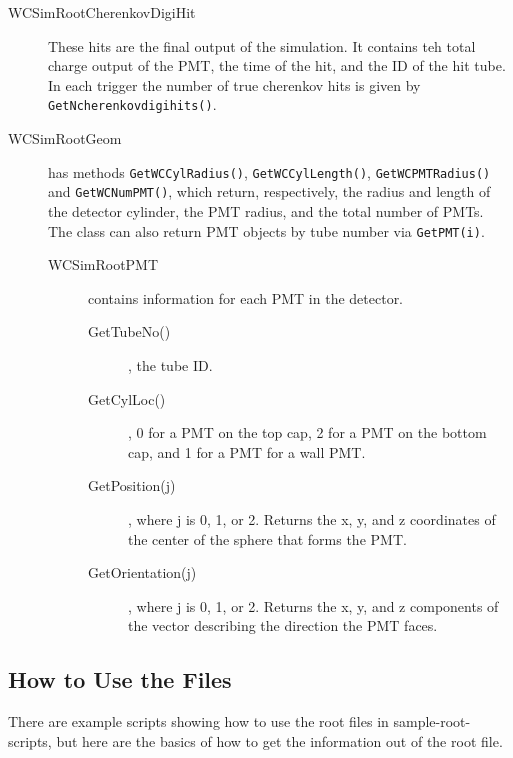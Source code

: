 \begin{description}
\begin{description}
\begin{description}
      \item[WCSimRootCherenkovDigiHit] These hits are the final output of the simulation. It contains teh total charge output of the PMT, the time of the hit, and the ID of the hit tube.  In each trigger the number of true cherenkov hits is given by \texttt{GetNcherenkovdigihits()}.
    \end{description}
  \end{description}
\end{description}


\begin{description}
  \item[WCSimRootGeom]  has methods \texttt{GetWCCylRadius()}, \texttt{GetWCCylLength()}, \texttt{GetWCPMTRadius()} and \texttt{GetWCNumPMT()}, which return, respectively, the radius and length of the detector cylinder, the PMT radius, and the total number of PMTs.  The class can also return PMT objects by tube number via \texttt{GetPMT(i)}.
    \begin{description}
    \item[WCSimRootPMT] contains information for each PMT in the detector.
    	\begin{description}
                \item[GetTubeNo()], the tube ID.
		\item[GetCylLoc()], 0 for a PMT on the top cap, 2 for a PMT on the bottom  cap, and 1 for a PMT for a wall PMT.
		\item[GetPosition(j)], where j is 0, 1, or 2.  Returns the x, y, and z coordinates of the center of the sphere that forms the PMT.
		\item[GetOrientation(j)], where j is 0, 1, or 2.  Returns the x, y, and z components of the vector describing the direction the PMT faces.
        \end{description}
    \end{description}
\end{description}


\subsection{How to Use the Files}




There are example scripts showing how to use the root files in sample-root-scripts, but here are the basics of how to get the information out of the root file.

